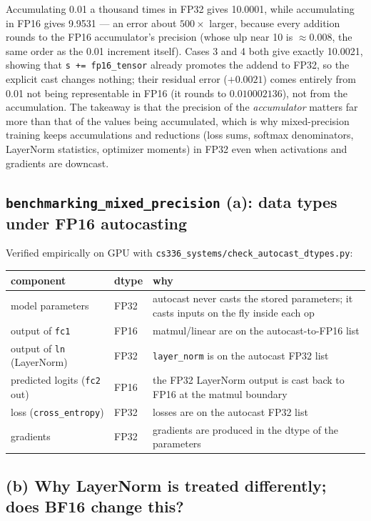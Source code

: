 \documentclass[11pt]{article}
\newcommand{\code}[1]{\texttt{#1}}
\begin{document}
Accumulating 0.01 a thousand times in FP32 gives 10.0001, while accumulating in FP16 gives 9.9531 ---
an error about $500\times$ larger, because every addition rounds to the FP16 accumulator's precision
(whose ulp near 10 is $\approx 0.008$, the same order as the 0.01 increment itself). Cases 3 and 4
both give exactly 10.0021, showing that \code{s += fp16\_tensor} already promotes the addend to FP32,
so the explicit cast changes nothing; their residual error ($+0.0021$) comes entirely from 0.01 not
being representable in FP16 (it rounds to $0.010002136$), not from the accumulation. The takeaway is
that the precision of the \emph{accumulator} matters far more than that of the values being
accumulated, which is why mixed-precision training keeps accumulations and reductions (loss sums,
softmax denominators, LayerNorm statistics, optimizer moments) in FP32 even when activations and
gradients are downcast.

\subsection{\texttt{benchmarking\_mixed_precision} (a): data types under FP16 autocasting}

Verified empirically on GPU with \code{cs336\_systems/check\_autocast\_dtypes.py}:

\begin{center}
\begin{tabular}{llp{6.5cm}}
\toprule
component & dtype & why \\
\midrule
model parameters & FP32 & autocast never casts the stored parameters; it casts inputs on the fly inside each op \\
output of \code{fc1} & FP16 & matmul/linear are on the autocast-to-FP16 list \\
output of \code{ln} (LayerNorm) & FP32 & \code{layer\_norm} is on the autocast FP32 list \\
predicted logits (\code{fc2} out) & FP16 & the FP32 LayerNorm output is cast back to FP16 at the matmul boundary \\
loss (\code{cross\_entropy}) & FP32 & losses are on the autocast FP32 list \\
gradients & FP32 & gradients are produced in the dtype of the parameters \\
\bottomrule
\end{tabular}
\end{center}

\subsection{(b) Why LayerNorm is treated differently; does BF16 change this?}
\end{document}
